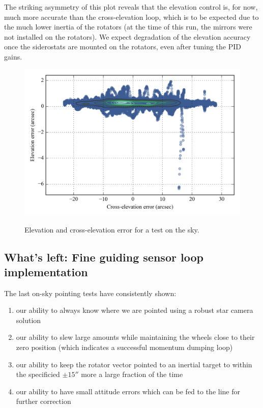 The striking asymmetry of this plot reveals that the elevation control is, for now, much more accurate than the cross-elevation loop, which is to be expected due to the much lower inertia of the rotators (at the time of this run, the mirrors were not installed on the rotators). We expect degradation of the elevation accuracy once the siderostats are mounted on the rotators, even after tuning the PID gains.

\begin{figure}[!h]
\begin{center}
\includegraphics{Figures/simple2DPlot_crossEl_elevation.png}
\label{fig:simple2DPlot_crossEl_elevation}
\vspace{-0.5cm}
\caption[Elevation and cross-elevation error]{Elevation and cross-elevation error for a test on the sky.}
\end{center}
\end{figure}




\subsection{What's left: Fine guiding sensor loop implementation}

The last on-sky pointing tests have consistently shown:
\begin{enumerate}
\item our ability to always know where we are pointed using a robust star camera solution
\item our ability to slew large amounts while maintaining the wheels close to their zero position (which indicates a successful momentum dumping loop)
\item our ability to keep the rotator vector pointed to an inertial target to within the specificied $\pm\ang{;;15}$ more a large fraction of the time
\item our ability to have small attitude errors which can be fed to the line for further correction
\end{enumerate}

